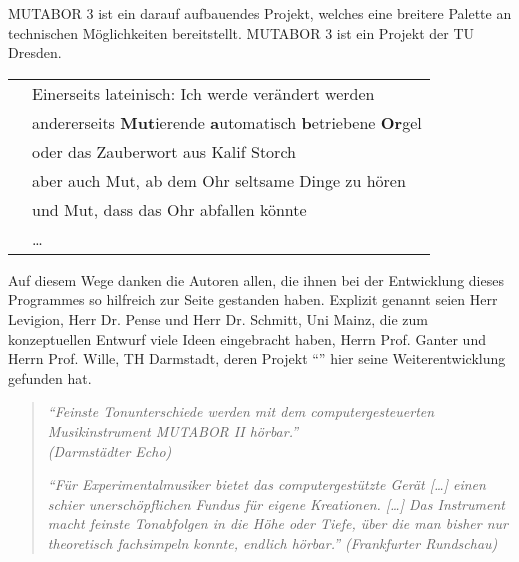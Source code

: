 MUTABOR 3 ist ein darauf aufbauendes Projekt, welches eine 
breitere Palette an technischen Möglichkeiten bereitstellt. MUTABOR 3
ist ein Projekt der TU Dresden.

\begin{tabular}{l@{\ \ --\ \ \ }l}
\mutabor{}  & Einerseits lateinisch: Ich werde verändert werden \\
\mutabor{}  & andererseits \textbf{Mut}ierende \textbf{a}utomatisch 
               \textbf{b}etriebene \textbf{Or}gel  \\
\mutabor{}  & oder das Zauberwort aus Kalif Storch \\
\mutabor{}  & aber auch Mut, ab dem Ohr seltsame Dinge zu hören \\
\mutabor{}  & und Mut, dass das Ohr abfallen könnte \\
\mutabor{}  & \ldots \\
\end{tabular}

 Auf diesem Wege danken die Autoren allen, die ihnen
bei der Entwicklung dieses Programmes so hilfreich zur Seite gestanden
haben. Explizit genannt seien Herr Levigion, Herr Dr. Pense und Herr
Dr. Schmitt, Uni Mainz, die zum konzeptuellen Entwurf viele Ideen
eingebracht haben, Herrn Prof. Ganter und Herrn Prof. Wille, TH
Darmstadt, deren Projekt "`\mutabor{}"' hier seine Weiterentwicklung
gefunden hat.

\vspace{2cm}

\begin{quotation}
\parbox[t]{7cm}{\it
"`Feinste Tonunterschiede werden mit dem computergesteuerten
Musikinstrument MUTABOR II hörbar."'\\ \rm (Darmstädter Echo)
} \hfill \parbox[t]{7cm}{\it
"`Für Experimentalmusiker bietet das computergestützte Gerät [\dots{}] einen
schier unerschöpflichen Fundus für eigene Kreationen. [\dots{}] Das Instrument
macht feinste Tonabfolgen in die Höhe oder Tiefe, über die man bisher nur
theoretisch fachsimpeln konnte, endlich hörbar."' \rm (Frankfurter Rundschau)}
\end{quotation}

\ifhtml\else\clearpage\fi

%


\iffalse
{}

